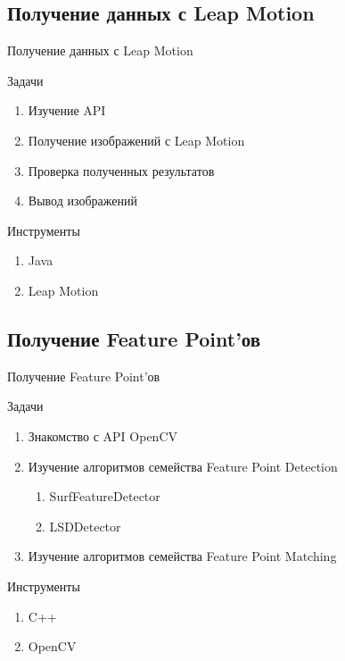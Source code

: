 \documentclass{beamer}
\begin{document}
\subsection{Получение данных с Leap Motion}
\begin{frame}[t]{Получение данных с Leap Motion}
	\begin{description}
		\item Задачи
		\begin{enumerate}
			\item Изучение API
			\item Получение изображений с Leap Motion
			\item Проверка полученных результатов
			\item Вывод изображений
		\end{enumerate}
		\item Инструменты
		\begin{enumerate}
			\item Java
			\item Leap Motion
		\end{enumerate}
	\end{description}
\end{frame}

\subsection{Получение Feature Point'ов}
\begin{frame}[t]{Получение Feature Point'ов}
	\begin{description}
		\item Задачи
		\begin{enumerate}
			\item Знакомство с API OpenCV
			\item Изучение алгоритмов семейства Feature Point Detection
			\begin{enumerate}
				\item SurfFeatureDetector
				\item LSDDetector
			\end{enumerate}
			\item Изучение алгоритмов семейства Feature Point Matching
		\end{enumerate}
		\item Инструменты
		\begin{enumerate}
			\item C++
			\item OpenCV
		\end{enumerate}
	\end{description}
\end{frame}
\end{document}
